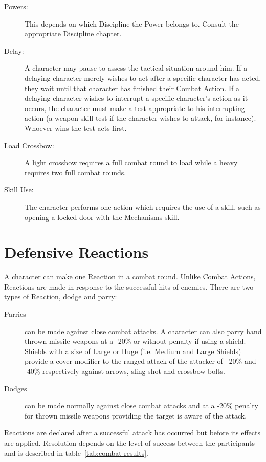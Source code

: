 \begin{description}
\item[Powers:] This depends on which Discipline the Power belongs to. Consult the appropriate Discipline chapter.
\item[Delay:] A character may pause to assess the tactical situation around him. If a delaying character merely wishes to act after a specific character has acted, they wait until that character has finished their Combat Action. If a delaying character wishes to interrupt a specific character’s action as it occurs, the character must make a test appropriate to his interrupting action (a weapon skill test if the character wishes to attack, for instance). Whoever wins the test acts first. 
\item[Load Crossbow:] A light crossbow requires a full combat round to load while a heavy requires two full combat rounds.
\item[Skill Use:] The character performs one action which requires the use of a skill, such as opening a locked door with the Mechanisms skill.
\end{description}


\section{Defensive Reactions}
\label{sec:defensive-reactions}
A character can make one Reaction in a combat round. Unlike Combat Actions, Reactions are made in response to the successful hits of enemies. There are two types of Reaction, dodge and parry:
\begin{description}
	\item[Parries] can be made against close combat attacks. A character can also parry hand thrown missile weapons at a -20\% or without penalty if using a shield. Shields with a size of Large or Huge (i.e. Medium and Large Shields) provide a cover modifier to the ranged attack of the attacker of -20\% and -40\% respectively against arrows, sling shot and crossbow bolts. 
	\item[Dodges] can be made normally against close combat attacks and at a -20\% penalty for thrown missile weapons providing the target is aware of the attack.  
\end{description}

\noindent Reactions are declared after a successful attack has occurred but before its effects are applied. Resolution depends on the level of success between the participants and is described in table~\ref{tab:combat-results}.

